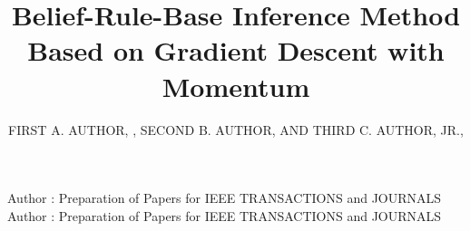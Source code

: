 \documentclass{ieeeaccess}
\begin{document}

\title{Belief-Rule-Base Inference Method Based on Gradient Descent with Momentum}
\author{\uppercase{First A. Author}, ,
    \uppercase{Second B. Author, and Third C. Author,
        Jr}.,
    }
\address[1]{National Institute of Standards and
    Technology, Boulder, CO 80305 USA (e-mail: author@boulder.nist.gov)}
\address[2]{Department of Physics, Colorado State University, Fort Collins,
    CO 80523 USA (e-mail: author@lamar.colostate.edu)}
\address[3]{Electrical Engineering Department, University of Colorado, Boulder, CO
    80309 USA}

\markboth
{Author \headeretal: Preparation of Papers for IEEE TRANSACTIONS and JOURNALS}
{Author \headeretal: Preparation of Papers for IEEE TRANSACTIONS and JOURNALS}

\end{document}
